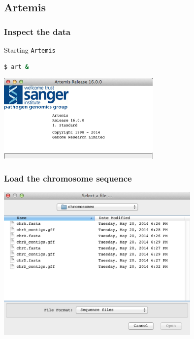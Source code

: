 \documentclass[table]{beamer}
\begin{document}
  \subsection{Artemis}
  \begin{frame}[fragile]
    \frametitle{Inspect the data}
    Starting \texttt{Artemis}
    \begin{lstlisting}[language=bash]
$ art &
    \end{lstlisting}
    \begin{center}
      \includegraphics[width=0.6\textwidth]{images/artemis_splash} 
    \end{center}
\end{frame} 
    
  \begin{frame}
    \frametitle{Load the chromosome sequence}
    \begin{center}
      \includegraphics[width=0.75\textwidth]{images/artemis_files} 
    \end{center}
\end{frame}     
    
\end{document}
